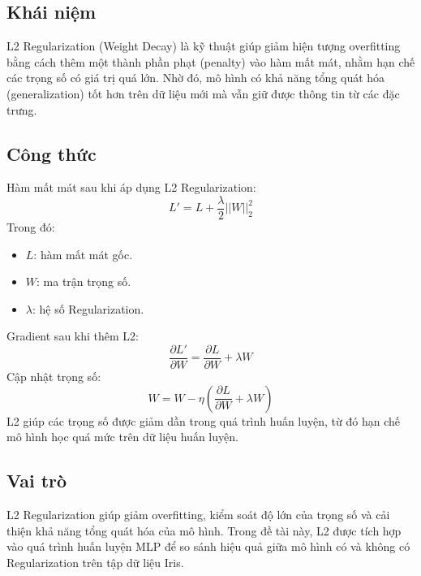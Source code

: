 \documentclass[12pt,a4paper]{report}
\begin{document}
\subsection{Khái niệm}
L2 Regularization (Weight Decay) là kỹ thuật giúp giảm hiện tượng overfitting bằng cách thêm một thành phần phạt (penalty) vào hàm mất mát, nhằm hạn chế các trọng số có giá trị quá lớn. Nhờ đó, mô hình có khả năng tổng quát hóa (generalization) tốt hơn trên dữ liệu mới mà vẫn giữ được thông tin từ các đặc trưng.

\subsection{Công thức}
Hàm mất mát sau khi áp dụng L2 Regularization:
\begin{equation}
    L' = L + \frac{\lambda}{2} ||W||_2^2
\end{equation}
Trong đó:
\begin{itemize}
    \item $L$: hàm mất mát gốc.
    \item $W$: ma trận trọng số.
    \item $\lambda$: hệ số Regularization.
\end{itemize}
Gradient sau khi thêm L2:
\begin{equation}
    \frac{\partial L'}{\partial W} = \frac{\partial L}{\partial W} + \lambda W
\end{equation}
Cập nhật trọng số:
\begin{equation}
    W = W - \eta \left( \frac{\partial L}{\partial W} + \lambda W \right)
\end{equation}
L2 giúp các trọng số được giảm dần trong quá trình huấn luyện, từ đó hạn chế mô hình học quá mức trên dữ liệu huấn luyện.

\subsection{Vai trò}
L2 Regularization giúp giảm overfitting, kiểm soát độ lớn của trọng số và cải thiện khả năng tổng quát hóa của mô hình. Trong đề tài này, L2 được tích hợp vào quá trình huấn luyện MLP để so sánh hiệu quả giữa mô hình có và không có Regularization trên tập dữ liệu Iris.
\end{document}
